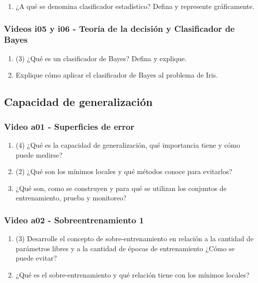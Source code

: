\documentclass[a4paper,10pt,spanish,oneside]{article}
\begin{document}
\begin{enumerate}
\item ¿A qué se denomina clasificador estadístico? Defina y represente gráficamente.
\end{enumerate}

\subsubsection{Videos i05 y i06 - Teoría de la decisión y Clasificador de Bayes}

\begin{enumerate}
\item (3) ¿Qué es un clasificador de Bayes? Defina y explique.

\item Explique cómo aplicar el clasificador de Bayes al problema de Iris.
\end{enumerate}

\subsection{Capacidad de generalización}

\subsubsection{Video a01 - Superficies de error}

\begin{enumerate}
\item (4) ¿Qué es la capacidad de generalización, qué importancia tiene y cómo puede medirse?

\item (2) ¿Qué son los mínimos locales y qué métodos conoce para evitarlos?

\item ¿Qué son, como se construyen y para qué se utilizan los conjuntos de entrenamiento, prueba y monitoreo?
\end{enumerate}

\subsubsection{Video a02 - Sobreentrenamiento 1}

\begin{enumerate}
\item (3) Desarrolle el concepto de sobre-entrenamiento en relación a la cantidad de parámetros libres y a la cantidad de épocas de entrenamiento ¿Cómo se puede evitar?

\item ¿Qué es el sobre-entrenamiento y qué relación tiene con los mínimos locales?
\end{enumerate}
\end{document}
